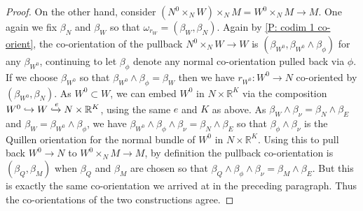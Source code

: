 \documentclass[12pt]{article}
\theoremstyle{plain}
\theoremstyle{definition}
\theoremstyle{remark}
\newcommand{\into}{\hookrightarrow}
\newcommand{\R}{\mathbb{R}}
\begin{document}
\begin{proof}
	On the other hand, consider $(N^0 \times_N W) \times_N M = W^0 \times_N M \to M$.
	One again we fix $\beta_N$ and $\beta_W$ so that $\omega_{r_W} = (\beta_W,\beta_N)$.
	Again by \cref{P: codim 1 co-orient}, the co-orientation of the pullback $N^0 \times_N W \to W$ is $(\beta_{W^0},\beta_{W^0} \wedge \beta_\phi)$ for any $\beta_{W^0}$, continuing to let $\beta_\phi$ denote any normal co-orientation pulled back via $\phi$.
	If we choose $\beta_{W^0}$ so that $\beta_{W^0} \wedge \beta_\phi = \beta_W$ then we have $r_{W^0} \colon W^0 \to N$ co-oriented by $(\beta_{W^0},\beta_N)$.
	As $W^0 \subset W$, we can embed $W^0$ in $N \times \R^K$ via the composition $W^0 \into W \xhookrightarrow{e}N \times \R^K$, using the same $e$ and $K$ as above.
	As $\beta_W \wedge \beta_\nu = \beta_N \wedge \beta_E$ and $\beta_W = \beta_{W^0} \wedge \beta_\phi$, we have $\beta_{W^0} \wedge \beta_\phi \wedge \beta_\nu = \beta_N \wedge \beta_E$ so that $\beta_\phi \wedge \beta_\nu$ is the Quillen orientation for the normal bundle of $W^0$ in $N \times \R^K$.
	Using this to pull back $W^0 \to N$ to $W^0 \times_N M \to M$, by definition the pullback co-orientation is $(\beta_Q,\beta_M)$ when $\beta_Q$ and $\beta_M$ are chosen so that $\beta_Q \wedge \beta_\phi \wedge \beta_\nu = \beta_M \wedge \beta_E$.
	But this is exactly the same co-orientation we arrived at in the preceding paragraph.
	Thus the co-orientations of the two constructions agree.
\end{proof}
\end{document}
